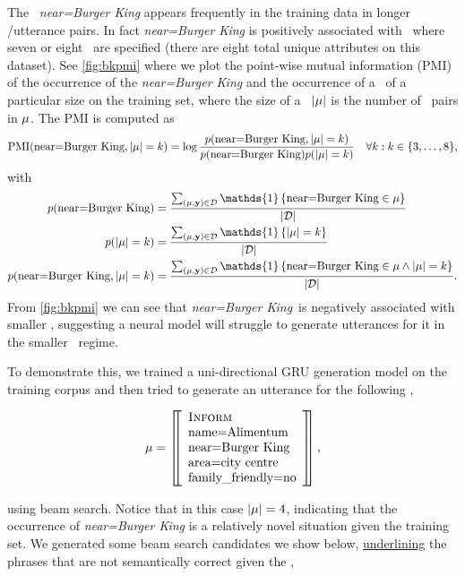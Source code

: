 The \attributevalue~\textit{near=Burger King} appears frequently in the
training data in longer \meaningrepresentation/utterance pairs. In fact
\textit{near=Burger King} is positively associated with
\meaningrepresentations~where seven or eight \attributes~are specified (there
are eight total unique attributes on this dataset). See \autoref{fig:bkpmi}
where we plot the point-wise mutual information (PMI) \citep{church1990} of the
occurrence of the \textit{near=Burger King} and the occurrence of a
\meaningrepresentation~of a particular size on the training set, where the size
of a \meaningrepresentation~${\left\vert \mu \right\vert}$ is the number of
\attributevalue~pairs in $\mu$.  The PMI is computed as 
\[\operatorname*{PMI}(\textrm{near=Burger King},  {\left\vert \mu \right\vert} = k) = \log \frac{p(\textrm{near=Burger King}, {\left\vert \mu \right\vert} = k)}{p( \textrm{near=Burger King}  ) p({\left\vert \mu \right\vert} = k)}     \quad \forall k : k \in \{3,\ldots,8\},\]
with \begin{align*}
    p(\AV{near}{Burger King}) &= \frac{\sum_{(\mr,\utttoks) \in \corpus}\mathds{1}\left\{ \AV{near}{Burger King} \in \mr \right\}}{\setsize{\corpus}} \\
    p(\setsize{\mr}=k) &= \frac{\sum_{(\mr,\utttoks) \in \corpus}\mathds{1}\left\{ \setsize{\mr} = k \right\}}{\setsize{\corpus}} \\
    p(\AV{near}{Burger King},\setsize{\mr}=k) &= \frac{\sum_{(\mr,\utttoks) \in \corpus}\mathds{1}\left\{\AV{near}{Burger King} \in \mr \wedge \setsize{\mr} = k \right\}}{\setsize{\corpus}}.
\end{align*}
From \autoref{fig:bkpmi} we can see that \textit{near=Burger King}~is
negatively associated with smaller \meaningrepresentations, suggesting a neural
model will struggle to generate utterances for it in the smaller
\meaningrepresentation~regime.



To demonstrate this, we trained a uni-directional GRU generation model on the
training corpus and then tried to generate an utterance for the following
\meaningrepresentation,
\begin{singlespace}
\[\mu = \left[\!\!\left[\begin{array}{l}\textsc{Inform}\\
        {\textrm{name=Alimentum}}  \\
        {\textrm{near=Burger King}}\\
        {\textrm{area=city centre}}\\
        {\textrm{family\_friendly=no}}\end{array}  \right]\!\!\right],\]
\end{singlespace}
\noindent using beam search. Notice that in this case ${\left\vert \mu \right\vert}=4$,
indicating that the occurrence of \textit{near=Burger King} is a relatively
novel situation given the training set.  We generated some beam search
candidates we show below, {\uline{underlining}} the phrases
that are not semantically correct given the \meaningrepresentation,


